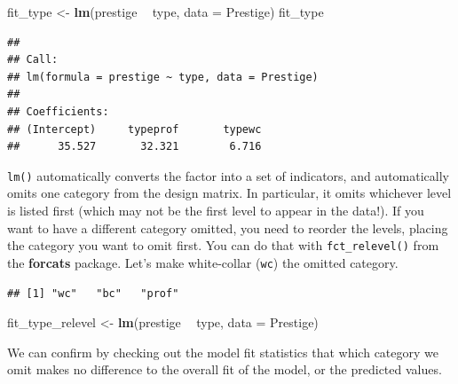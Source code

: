 \documentclass[12pt,oneside,openany]{book}
\newenvironment{Shaded}{\begin{snugshade}}{\end{snugshade}}
\newcommand{\KeywordTok}[1]{\textcolor[rgb]{0.13,0.29,0.53}{\textbf{#1}}}
\newcommand{\DataTypeTok}[1]{\textcolor[rgb]{0.13,0.29,0.53}{#1}}
\newcommand{\StringTok}[1]{\textcolor[rgb]{0.31,0.60,0.02}{#1}}
\newcommand{\OperatorTok}[1]{\textcolor[rgb]{0.81,0.36,0.00}{\textbf{#1}}}
\newcommand{\NormalTok}[1]{#1}
\begin{document}
\begin{Shaded}
\begin{Highlighting}[]
\NormalTok{fit_type <-}\StringTok{ }\KeywordTok{lm}\NormalTok{(prestige }\OperatorTok{~}\StringTok{ }\NormalTok{type, }\DataTypeTok{data =}\NormalTok{ Prestige)}
\NormalTok{fit_type}
\end{Highlighting}
\end{Shaded}

\begin{verbatim}
## 
## Call:
## lm(formula = prestige ~ type, data = Prestige)
## 
## Coefficients:
## (Intercept)     typeprof       typewc  
##      35.527       32.321        6.716
\end{verbatim}

\texttt{lm()} automatically converts the factor into a set of
indicators, and automatically omits one category from the design matrix.
In particular, it omits whichever level is listed first (which may not
be the first level to appear in the data!). If you want to have a
different category omitted, you need to reorder the levels, placing the
category you want to omit first. You can do that with
\texttt{fct\_relevel()} from the \textbf{forcats} package. Let's make
white-collar (\texttt{wc}) the omitted category.

\begin{Shaded}
\end{Shaded}

\begin{verbatim}
## [1] "wc"   "bc"   "prof"
\end{verbatim}

\begin{Shaded}
\begin{Highlighting}[]
\NormalTok{fit_type_relevel <-}\StringTok{ }\KeywordTok{lm}\NormalTok{(prestige }\OperatorTok{~}\StringTok{ }\NormalTok{type, }\DataTypeTok{data =}\NormalTok{ Prestige)}
\end{Highlighting}
\end{Shaded}

We can confirm by checking out the model fit statistics that which
category we omit makes no difference to the overall fit of the model, or
the predicted values.
\end{document}
